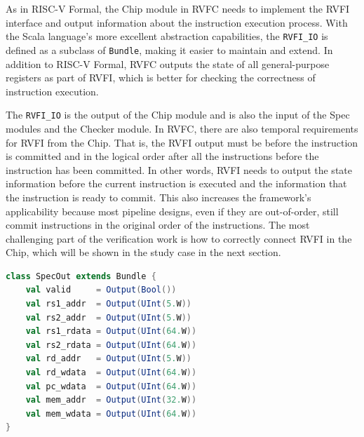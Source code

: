 \documentclass[conference]{IEEEtran}
\theoremstyle{definition}
\begin{document}
As in RISC-V Formal, the Chip module in RVFC needs to implement the RVFI interface and output information about the instruction execution process.
With the Scala language's more excellent abstraction capabilities, the \verb|RVFI_IO| is defined as a subclass of \verb|Bundle|, making it easier to maintain and extend.
In addition to RISC-V Formal, RVFC outputs the state of all general-purpose registers as part of RVFI, which is better for checking the correctness of instruction execution.

The \verb|RVFI_IO| is the output of the Chip module and is also the input of the Spec modules and the Checker module.
In RVFC, there are also temporal requirements for RVFI from the Chip.
That is, the RVFI output must be before the instruction is committed and in the logical order after all the instructions before the instruction has been committed.
In other words, RVFI needs to output the state information before the current instruction is executed and the information that the instruction is ready to commit.
This also increases the framework's applicability because most pipeline designs, even if they are out-of-order, still commit instructions in the original order of the instructions.
The most challenging part of the verification work is how to correctly connect RVFI in the Chip, which will be shown in the study case in the next section.

\begin{lstlisting}[language=scala, caption={SpecOut Definition in RVFC}, label=specout]
class SpecOut extends Bundle {
    val valid     = Output(Bool())
    val rs1_addr  = Output(UInt(5.W))
    val rs2_addr  = Output(UInt(5.W))
    val rs1_rdata = Output(UInt(64.W))
    val rs2_rdata = Output(UInt(64.W))
    val rd_addr   = Output(UInt(5.W))
    val rd_wdata  = Output(UInt(64.W))
    val pc_wdata  = Output(UInt(64.W))
    val mem_addr  = Output(UInt(32.W))
    val mem_wdata = Output(UInt(64.W))
}
\end{lstlisting}
\end{document}
